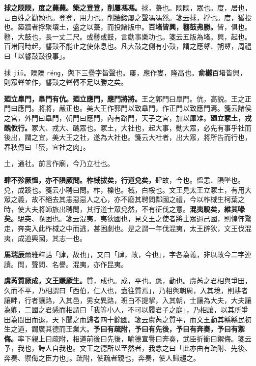 \textbf{捄之陾陾，度之薨薨。築之登登，削屢馮馮。}{\footnotesize 捄，虆也。陾陾，眾也。度，居也，言百姓之勸勉也。登登，用力也。削牆鍛屢之聲馮馮然。箋云捄，捊也。度，猶投也。築牆者捊聚壤土，盛之以虆，而投諸版中。}\textbf{百堵皆興，鼛鼓弗勝。}{\footnotesize 皆，俱也。鼛，大鼓也，長一丈二尺。或鼛或鼓，言勸事樂功也。箋云五版為堵。興，起也。百堵同時起，鼛鼓不能止之使休息也。凡大鼓之側有小鼓，謂之應鼙、朔鼙，周禮曰「以鼛鼓鼓役事」。}

\begin{quoting}捄 \texttt{jiū}。陾陾 \texttt{réng}，與下三疊字皆聲也。屢，應作婁，隆高也。\textbf{俞樾}百堵皆興，則眾聲並作，鼛鼓之聲轉不足以勝之矣。\end{quoting}

\textbf{廼立臯門，臯門有伉。廼立應門，應門將將。}{\footnotesize 王之郭門曰臯門。伉，高貌。王之正門曰應門。將將，嚴正也。美大王作郭門以致臯門，作正門以致應門焉。箋云諸侯之宮，外門曰臯門，朝門曰應門，內有路門，天子之宮，加以庫雉。}\textbf{廼立冢土，戎醜攸行。}{\footnotesize 冢大、戎大、醜眾也。冢土，大社也，起大事，動大眾，必先有事乎社而後出，謂之宜，美大王之社，遂為大社也。箋云大社者，出大眾，將所告而行也，春秋傳曰「蜃，宜社之肉」。}

\begin{quoting}土，通社。前言作廟，今乃立社也。\end{quoting}

\textbf{肆不殄厥慍，亦不隕厥問。柞棫拔矣，行道兌矣，}{\footnotesize 肆故，今也。慍恚、隕墜也。兌，成蹊也。箋云小聘曰問。柞，櫟也。棫，白桵也。文王見太王立冢土，有用大眾之義，故不絕去其恚惡惡人之心，亦不廢其聘問鄰國之禮，今以柞棫生柯葉之時，使大夫將師旅出聘問，其行道士眾兌然，不有征伐之意。}\textbf{混夷駾矣，維其喙矣。}{\footnotesize 駾突、喙困也。箋云混夷，夷狄國也，見文王之使者將士眾過己國，則惶怖驚走，奔突入此柞棫之中而逃，甚困劇也。是之謂一年伐混夷，太王辟狄，文王伐混夷，成道興國，其志一也。}

\begin{quoting}\textbf{馬瑞辰}爾雅釋詁「肆，故也」，又曰「肆，故，今也」，字各為義，非以故今二字連讀。問，聲問、名譽。混夷，亦作昆夷。\end{quoting}

\textbf{虞芮質厥成，文王蹶厥生。}{\footnotesize 質，成也。成，平也。蹶，動也。虞芮之君相與爭田，久而不平，乃相謂曰「西伯，仁人也，盍往質焉」，乃相與朝周，入其境，則耕者讓畔，行者讓路，入其邑，男女異路，班白不提挈，入其朝，士讓為大夫，大夫讓為卿，二國之君感而相謂曰「我等小人，不可以履君子之庭」，乃相讓，以其所爭田為間田而退，天下聞之而歸者四十餘國。箋云虞芮之質平，而文王動其緜緜民初生之道，謂廣其德而王業大。}\textbf{予曰有疏附，予曰有先後，予曰有奔奏，予曰有禦侮。}{\footnotesize 率下親上曰疏附，相道前後曰先後，喻德宣譽曰奔奏，武臣折衝曰禦侮。箋云予，我也，詩人自我也。文王之德所以至然者，我念之曰「此亦由有疏附、先後、奔奏、禦侮之臣力也」。疏附，使疏者親也，奔奏，使人歸趨之。}

